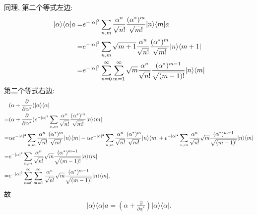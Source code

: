 \documentclass{assignment}
\begin{document}
\begin{pf}
    同理, 第二个等式左边:
    \begin{align}
        \notag\lvert\alpha\rangle\langle\alpha\rvert a=&e^{-\left\lvert\alpha\right\rvert^2}\sum_{n,m}\frac{\alpha^n}{\sqrt{n!}}\frac{(\alpha^*)^m}{\sqrt{m!}}\lvert n\rangle\langle m\rvert a\\
        \notag=&e^{-\left\lvert\alpha\right\rvert^2}\sum_{n,m}\sqrt{m+1}\frac{\alpha^n}{\sqrt{n!}}\frac{(\alpha^*)^m}{\sqrt{m!}}\lvert n\rangle\langle m+1\rvert\\
        =&e^{-\left\lvert\alpha\right\rvert^2}\sum_{n=0}^{\infty}\sum_{m=1}^{\infty}\sqrt{m}\frac{\alpha^n}{\sqrt{n!}}\frac{(\alpha^*)^{m-1}}{\sqrt{(m-1)!}}\lvert n\rangle\langle m\rvert
    \end{align}
    第二个等式右边:
    \begin{align}
        \notag&(\alpha+\frac{\partial}{\partial\alpha^*})\lvert\alpha\rangle\langle\alpha\rvert\\
        \notag=&(\alpha+\frac{\partial}{\partial\alpha^*})e^{-\left\lvert\alpha\right\rvert^2}\sum_{n,m}\frac{\alpha^n}{\sqrt{n!}}\frac{(\alpha^*)^m}{\sqrt{m!}}\lvert n\rangle\langle m\rvert\\
        \notag=&\alpha e^{-\left\lvert\alpha\right\rvert^2}\sum_{n,m}\frac{\alpha^n}{\sqrt{n!}}\frac{(\alpha^*)^m}{\sqrt{m!}}\lvert n\rangle\langle m\rvert-\alpha e^{-\left\lvert\alpha\right\rvert^2}\sum_{n,m}\frac{\alpha^n}{\sqrt{n!}}\frac{(\alpha^*)^m}{\sqrt{m!}}\lvert n\rangle\langle m\rvert+e^{-\left\lvert\alpha\right\rvert^2}\sum_{n,m}\frac{\alpha^n}{\sqrt{n!}}\sqrt{m}\frac{(\alpha^*)^{m-1}}{\sqrt{(m-1)!}}\lvert n\rangle\langle m\rvert\\
        \notag=&e^{-\left\lvert\alpha\right\rvert^2}\sum_{n,m}\frac{\alpha^n}{\sqrt{n!}}\sqrt{m}\frac{(\alpha^*)^{m-1}}{\sqrt{(m-1)!}}\lvert n\rangle\langle m\rvert\\
        =&e^{-\left\lvert\alpha\right\rvert^2}\sum_{n=0}^{\infty}\sum_{m=1}^{\infty}\frac{\alpha^n}{\sqrt{n!}}\sqrt{m}\frac{(\alpha^*)^{m-1}}{\sqrt{(m-1)!}}\lvert n\rangle\langle m\rvert,
    \end{align}
    故
    \begin{align}
        \lvert\alpha\rangle\langle\alpha\rvert a=(\alpha+\frac{\partial}{\partial\alpha^*})\lvert\alpha\rangle\langle\alpha\rvert.
    \end{align}
\end{pf}
\end{document}
